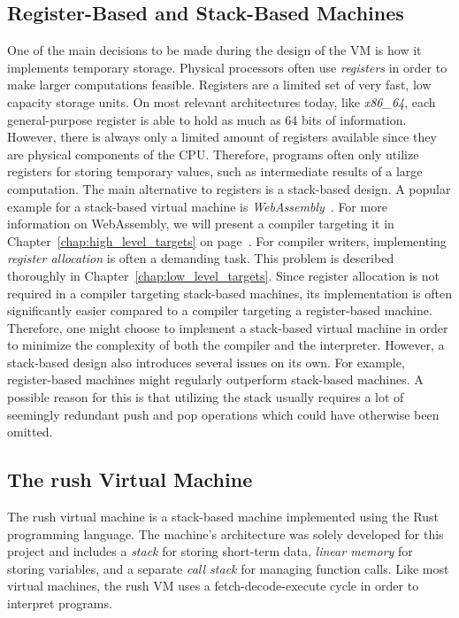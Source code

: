 \subsection{Register-Based and Stack-Based Machines}

One of the main decisions to be made during the design of the VM is how it implements temporary storage.
Physical processors often use \emph{registers} in order to make larger computations feasible.
Registers are a limited set of very fast, low capacity storage units.
On most relevant architectures today, like \emph{x86\_64}, each general-purpose register is able to hold as much as 64 bits of information.
However, there is always only a limited amount of registers available since they are physical components of the CPU\@.
Therefore, programs often only utilize registers for storing temporary values, such as intermediate results of a large computation.
The main alternative to registers is a stack-based design.
A popular example for a stack-based virtual machine is \emph{WebAssembly}~\cite[p.~44]{Sendil2022-fy}.
For more information on WebAssembly, we will present a compiler targeting it in Chapter~\ref{chap:high_level_targets} on page~\pageref{sec:wasm}.
For compiler writers, implementing \emph{register allocation} is often a demanding task.
This problem is described thoroughly in Chapter~\ref{chap:low_level_targets}.
Since register allocation is not required in a compiler targeting stack-based machines, its implementation is often significantly easier compared to a compiler targeting a register-based machine.
Therefore, one might choose to implement a stack-based virtual machine in order to minimize the complexity of both the compiler and the interpreter.
However, a stack-based design also introduces several issues on its own.
For example, register-based machines might regularly outperform stack-based machines.
A possible reason for this is that utilizing the stack usually requires a lot of seemingly redundant push and pop operations which could have otherwise been omitted.

\subsection{The rush Virtual Machine}

The rush virtual machine is a stack-based machine implemented using the Rust programming language.
The machine's architecture was solely developed for this project and includes a \emph{stack} for storing short-term data, \emph{linear memory} for storing variables, and a separate \emph{call stack} for managing function calls.
Like most virtual machines, the rush VM uses a fetch-decode-execute cycle in order to interpret programs.

